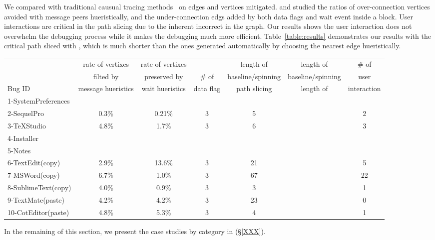 
We compared \xxx with traditional causual tracing methods~\cite{} on edges and
vertices \xxx mitigated. and studied the ratios of over-connection vertices
avoided with message peers hueristically, and the under-connection edgs added by
both data flags and wait event inside a block. User interactions are critical in
the path slicing due to the inherent incorrect in the graph. Our results shows
the user interaction does not overwhelm the debugging process while it makes
the debugging much more efficient. Table~\ref{table:results} demonstrates our
results with the critical path sliced with \xxx, which is much shorter than the
ones generated automatically by choosing the nearest edge hueristically.


\begin{table*}[ht]
\footnotesize
\centering
  \begin{tabularx}{\textwidth}{l|cccccc}
 	   & rate of vertixes   & rate of vertixes  &           & length of           & length of    & \# of\\
       & filted by          & preserved by      & \# of     & baseline/spinning& baseline/spinning&user\\
Bug ID & message hueristics & wait hueristics& data flag & path slicing        & length of  &interaction \\
\hline
\hline
 1-SystemPreferences&&&&&&\\
 2-SequelPro & 0.3\% & 0.21\% & 3 & 5 &  & 2  \\
 3-TeXStudio & 4.8\% & 1.7\% & 3 & 6 &  & 3 \\
 4-Installer &&&&&& \\
 5-Notes &&&&&& \\
 6-TextEdit(copy)&2.9\% &13.6\% & 3 & 21 & & 5\\
 7-MSWord(copy)&6.7\%&1.0\%& 3 &67& & 22\\
 8-SublimeText(copy)&4.0\%& 0.9\%&3 & 3 & & 1\\
 9-TextMate(paste) & 4.2\% & 4.2\% &3 & 23& & 0\\
 10-CotEditor(paste) & 4.8\%& 5.3\%& 3 & 4 & & 1\\
\hline
  \end{tabularx}
  \caption{Graph Comparison}
  \label{table:results}
\end{table*}

In the remaining of this section, we present the case studies by category in (\S\ref{XXX}). 

